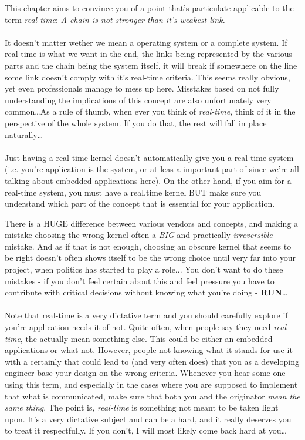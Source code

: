 This chapter aims to convince you of a point that's particulate applicable to the term \textit{real-time}: \textit{A chain is not stronger than it's weakest link.}
\\\\
It doesn't matter wether we mean a operating system or a complete system. If real-time is what we want in the end, the links being represented by the various parts and the chain being the system itself, it will break if somewhere on the line some link doesn't comply with it's real-time criteria. This seems really obvious, yet even professionals manage to mess up here. Misstakes based on not fully understanding the implications of this concept are also unfortunately very common\ldots As a rule of thumb, when ever you think of \textit{real-time}, think of it in the perspective of the whole system. If you do that, the rest will fall in place naturally\ldots
\\\\
Just having a real-time kernel doesn't automatically give you a real-time system (i.e. you're application is the system, or at leas a important part of since we're all talking about embedded applications here). On the other hand, if you aim for a real-time system, you must have a real.time kernel BUT make sure you understand which part of the concept that is essential for your application. 

There is a HUGE difference between various vendors and concepts, and making a mistake choosing the wrong kernel often a \textit{BIG} and practically \textit{irreversible} mistake. And as if that is not enough, choosing an obscure kernel that seems to be right doesn't often shows itself to be the wrong choice until very far into your project, when politics has started to play a role... You don't want to do these mistakes - if you don't feel certain about this and feel pressure you have to contribute with critical decisions without knowing what you're doing - \textbf{RUN}\ldots
\\\\
Note that real-time is a very dictative term and you should carefully explore if you're application needs it of not. Quite often, when people say they need \textit{real-time}, the actually mean something else. This could be either an embedded applications or what-not. However, people not knowing what it stands for use it with a certainly that could lead to (and very often does) that you as a developing engineer base your design on the wrong criteria. Whenever you hear some-one using this term, and especially in the cases where you are supposed to implement that what is communicated, make sure that both you and the originator \textit{mean the same thing}. The point is, \textit{real-time} is something not meant to be taken light upon. It's a very dictative subject and can be a hard, and it really deserves you to treat it respectfully. If you don't, I will most likely come back hard at you\ldots



